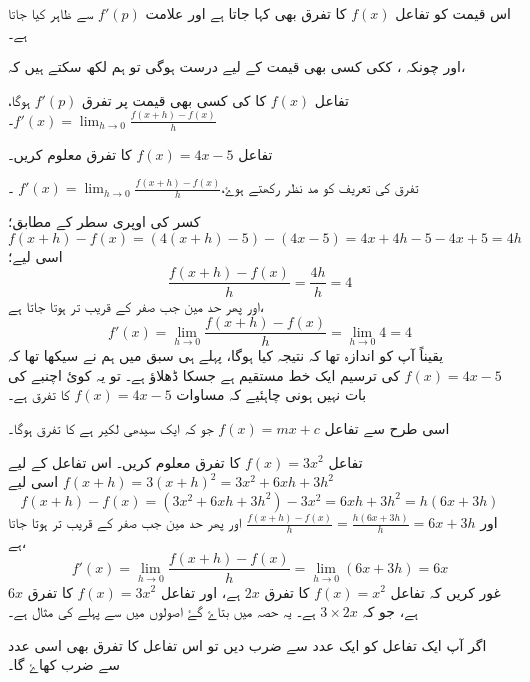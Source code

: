 اس قیمت کو تفاعل \(f(x)\) کا تفرق بھی کہا جاتا ہے  اور علامت \(f'(p)\) سے ظاہر کیا جاتا ہے۔

اور چونکہ   ،  ککی کسی بھی قیمت کے لیے درست ہوگی تو ہم لکھ سکتے ہیں کہ، 

تفاعل \(f(x)\) کا  کی کسی بھی قیمت پر تفرق \(f'(p)\) ہوگا،  \(f'(x)=\lim_{h \to 0} \frac{f(x+h)-f(x)}{h}\)۔


تفاعل \(f(x)=4x-5\) کا تفرق معلوم کریں۔

تفرق کی تعریف کو مد نظر رکھتے ہوۓ،\(f'(x)=\lim_{h \to 0} \frac{f(x+h)-f(x)}{h}\) ۔

کسر کی اوپری سطر کے مطابق؛
\[f(x+h)-f(x)=(4(x+h)-5)-(4x-5)=4x+4h-5-4x+5=4h\]
 اسی لیے؛
\[\frac{f(x+h)-f(x)}{h}=\frac{4h}{h}=4\]
اور پھر حد مین جب  صفر کے قریب تر ہوتا جاتا ہے، 
\[f'(x)=\lim_{h \to 0} \frac{f(x+h)-f(x)}{h}= \lim_{h \to 0} 4=4\]
یقیناً آپ کو اندازہ تھا کہ نتیجہ کیا ہوگا، پہلے ہی سبق میں ہم نے سیکھا تھا کہ \(f(x)=4x-5\) کی ترسیم ایک خط مستقیم ہے جسکا ڈھلاؤ  ہے۔ تو یہ کوئ اچنبے کی بات نہیں ہونی چاہئیے کہ مساوات \(f(x)=4x-5\) کا تفرق  ہے۔

اسی طرح سے تفاعل \(f(x)=mx+c\) جو کہ ایک سیدھی لکیر ہے کا تفرق  ہوگا۔ 

تفاعل \(f(x)=3x^2\) کا تفرق معلوم کریں۔
 اس تفاعل کے لیے \(f(x+h)=3(x+h)^2 =3x^2+6xh+3h^2\)
اسی لیے
\[f(x+h)-f(x)=(3x^2 +6xh+3h^2)-3x^2=6xh+3h^2=h(6x+3h)\]
اور \(\frac{f(x+h)-f(x)}{h}=\frac{h(6x+3h)}{h}=6x+3h\)
اور پھر حد مین جب  صفر کے قریب تر ہوتا جاتا ہے، 
\[f'(x)=\lim_{h \to 0} \frac{f(x+h)-f(x)}{h} =\lim_{h \to 0} (6x+3h)=6x\]
غور کریں کہ تفاعل \(f(x)=x^2\) کا تفرق \(2x\) ہے، اور تفاعل \(f(x)=3x^2\) کا تفرق \(6x\) ہے، جو کہ \(3 \times 2x\) ہے۔ یہ حصہ میں بتاۓ گۓ اصولوں میں سے پہلے کی مثال ہے۔ 

اگر آپ ایک تفاعل کو ایک عدد سے ضرب دیں تو اس تفاعل کا تفرق بھی اسی عدد سے ضرب کھاۓ گا۔




























